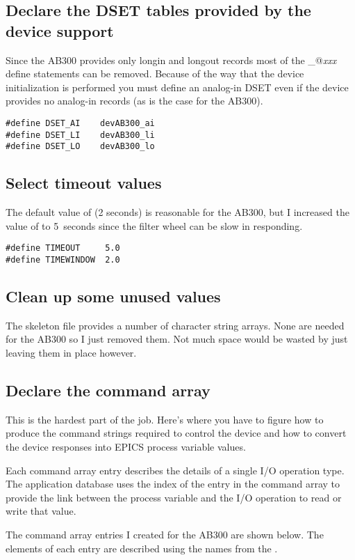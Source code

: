 \documentclass[twoside]{article}
\begin{document}
\subsection{Declare the DSET tables provided by the device support}
Since the AB300
provides only longin and longout records most of the \verb@DSET_@{\it xxx}
define statements can
be removed.  Because of the way that the device initialization is performed
you must define an analog-in DSET even if the device provides no analog-in
records (as is the case for the AB300).
\begin{verbatim}
#define DSET_AI    devAB300_ai
#define DSET_LI    devAB300_li
#define DSET_LO    devAB300_lo
\end{verbatim}

\subsection{Select timeout values}
The default value of \verb@TIMEWINDOW@  (2 seconds) is
reasonable for the AB300, but I increased the value of \verb@TIMEOUT@ to
5~seconds since the filter wheel can be slow in responding.
\begin{verbatim}
#define TIMEOUT     5.0
#define TIMEWINDOW  2.0
\end{verbatim}


\subsection{Clean up some unused values}
The skeleton file provides a number of
character string arrays.  None are needed for the AB300 so I just removed them.
Not much space would be wasted by just leaving them in place however.

\subsection{Declare the command array}
This is the hardest part of the job.  Here's where you have to figure
how to produce the command strings required to control the device
and how to convert the device responses into EPICS process variable
values.

Each command array entry describes the details of a single
I/O operation type.
The application database uses the index of the entry in the command array to
provide the link between the process variable and the I/O operation to
read or write that value.

The command array entries I created for the AB300 are shown below.  The
elements of each entry are described using the names from
the
.
\end{document}
